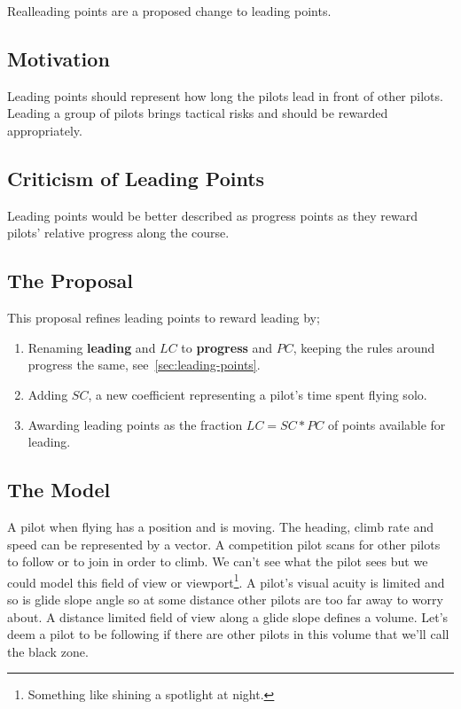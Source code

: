 \documentclass[gap.tex]{subfiles}
\begin{document}
\label{sec:real-leading}
Real\footnotemark leading points are a proposed change to leading points.

\subsection{Motivation}
Leading points should represent how long the pilots lead in front of other
pilots. Leading a group of pilots brings tactical risks and should be rewarded
appropriately.

\subsection{Criticism of Leading Points}
Leading points would be better described as progress points as they reward
pilots' relative progress along the course.

\subsection{The Proposal}
This proposal refines leading points to reward leading by;

\begin{enumerate}
    \item Renaming \textbf{leading} and \(LC\) to \textbf{progress} and \(PC\),
        keeping the rules around progress the same,
        see~\ref{sec:leading-points}.

    \item Adding \(SC\), a new coefficient representing a pilot's time spent
        flying solo.

    \item Awarding leading points as the fraction \(LC = SC * PC\) of points
        available for leading.
\end{enumerate}

\subsection{The Model}
A pilot when flying has a position and is moving. The heading, climb rate and
speed can be represented by a vector. A competition pilot scans for other
pilots to follow or to join in order to climb. We can't see what the pilot sees
but we could model this field of view or viewport\footnote{Something like
shining a spotlight at night.}. A pilot's visual acuity is limited and so is
glide slope angle so at some distance other pilots are too far away to worry
about. A distance limited field of view along a glide slope defines a volume.
Let's deem a pilot to be following if there are other pilots in this volume
that we'll call the black zone.
\end{document}
